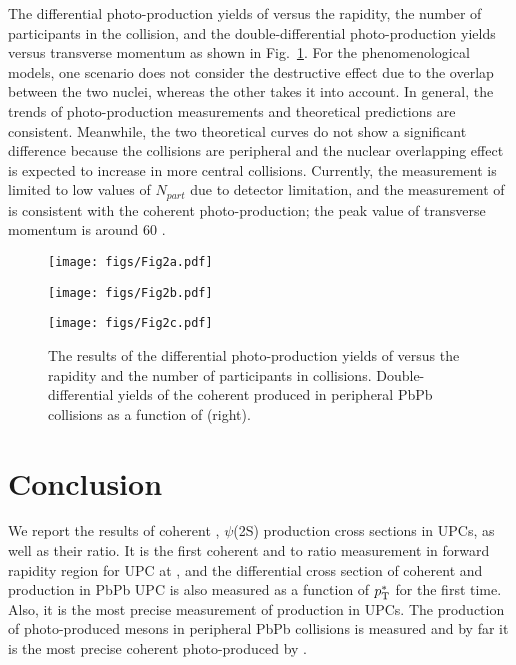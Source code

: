 \documentclass{appolb}
\begin{document}
 The differential photo-production yields of \jpsi versus the rapidity, the number of participants in the collision, and the double-differential \jpsi photo-production yields versus transverse momentum as shown in Fig.~\ref{com}. 
For the phenomenological models, one scenario does not consider the destructive effect due to the overlap between the two nuclei, whereas the other takes it into account. 
In general, the trends of \jpsi photo-production measurements and theoretical predictions are consistent.
Meanwhile, the two theoretical curves do not show a significant difference because the collisions are peripheral and the nuclear overlapping effect is expected to increase in more central collisions. 
Currently, the measurement is limited to low values of $N_{part}$ due to detector limitation, 
and the measurement of \pt is consistent with the coherent \jpsi photo-production; the peak value of transverse momentum is around 60 \mevc.
\begin{figure}[!htbp]
    \centering
    \begin{minipage}[t]{0.32\linewidth}
        \centering
        \texttt{[image: figs/Fig2a.pdf]}
    \end{minipage}
    \begin{minipage}[t]{0.32\linewidth}
        \centering
        \texttt{[image: figs/Fig2b.pdf]}
    \end{minipage}
    \begin{minipage}[t]{0.32\linewidth}
        \centering
        \texttt{[image: figs/Fig2c.pdf]}
    \end{minipage}
    \caption{The results of the differential photo-production yields of \jpsi versus the rapidity and the number of participants in collisions. Double-differential yields of the coherent \jpsi produced in peripheral PbPb collisions as a function of \pt (right).}
    \label{com}
\vspace{1cm}
\end{figure}
\section{Conclusion}
We report the results of coherent  \jpsi, $\psi$(2S) production cross sections in UPCs, as well as their ratio.  
It is the first coherent \psitwos and \psitwos to \jpsi ratio measurement in forward rapidity region for UPC at \lhc, and the differential cross section of coherent \jpsi and \psitwos production in PbPb UPC is also measured as a function of $p_{\mathrm{T}}^{*}$ for the first time. Also, it is the most precise measurement of \jpsi production in UPCs.
The production of photo-produced \jpsi mesons in peripheral PbPb collisions is measured and by far it is the most precise coherent photo-produced \jpsi by \lhcb. 


% 

\end{document}
